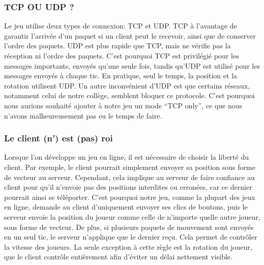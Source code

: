 \documentclass[a4paper]{article}
\begin{document}
\subsubsection{TCP OU UDP ?}
Le jeu utilise deux types de connexion: TCP et UDP. TCP à l’avantage de garantir l'arrivée d’un paquet si un client peut le recevoir, ainsi que de conserver l’ordre des paquets. UDP est plus rapide que TCP, mais ne vérifie pas la réception ni l’ordre des paquets. C’est pourquoi TCP est privilégié pour les messages importants, envoyés qu'une seule fois, tandis qu’UDP est utilisé pour les messages envoyés à chaque tic. En pratique, seul le temps, la position et la rotation utilisent UDP. Un autre inconvénient d’UDP est que certains réseaux, notamment celui de notre collège, semblent bloquer ce protocole. C’est pourquoi nous aurions souhaité ajouter à notre jeu un mode “TCP only”, ce que nous n'avons malheureusement pas eu le temps de faire.

\subsubsection{Le client (n’) est (pas) roi}
Lorsque l’on développe un jeu en ligne, il est nécessaire de choisir la liberté du client. Par exemple, le client pourrait simplement envoyer sa position sous forme de vecteur au serveur. Cependant, cela implique au serveur de faire confiance au client pour qu’il n’envoie pas des positions interdites ou erronées, car ce dernier pourrait ainsi se téléporter. C’est pourquoi notre jeu, comme la plupart des jeux en ligne, demande au client d’uniquement envoyer ses clics de boutons, puis le serveur envoie la position du joueur comme celle de n’importe quelle autre joueur, sous forme de vecteur. De plus, si plusieurs paquets de mouvement sont envoyés en un seul tic, le serveur n’applique que le dernier reçu. Cela permet de contrôler la vitesse des joueurs. La seule exception à cette règle est la rotation du joueur, que le client contrôle entièrement afin d’éviter un délai nettement visible.
\end{document}
